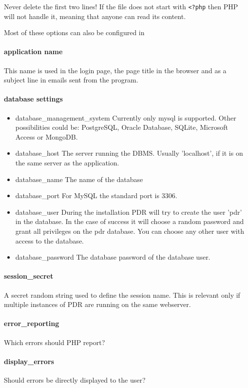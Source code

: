 Never delete the first two lines! If the file does not start with \lstinline|<?php| then PHP will not handle it, meaning that anyone can read its content. 

Most of these options can also be configured in 
\paragraph{application name}
This name is used in the login page, the page title in the browser and as a subject line in emails sent from the program.
\paragraph{database settings}
\begin{itemize}
	\item database\_management\_system 	Currently only mysql is supported. 	Other possibilities could be: 	PostgreSQL,	Oracle Database, SQLite, Microsoft Access or MongoDB.
	\item database\_host The server running the DBMS. Usually 'localhost', if it is on the same server as the application.
	\item database\_name The name of the database
	\item database\_port For MySQL the standard port is 3306.
	\item database\_user During the installation PDR will try to create the user 'pdr' in the database. In the case of success it will choose a random password and grant all privileges on the pdr database. You can choose any other user with access to the database.
	\item database\_password The database password of the database user.
\end{itemize}
\paragraph{session\_secret}
A secret random string used to define the session name. This is relevant only if multiple instances of PDR are running on the same webserver.
\paragraph{error\_reporting}
Which errors should PHP report? 
\paragraph{display\_errors}
Should errors be directly displayed to the user?
